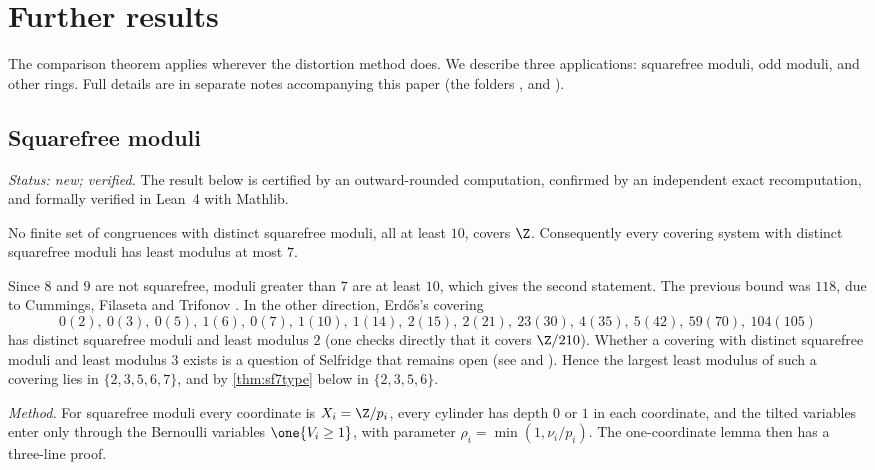 \section{Further results}\label{sec:further}
The comparison theorem applies wherever the distortion method does. We describe three applications: squarefree
moduli, odd moduli, and other rings. Full details are in separate notes accompanying this paper (the folders
,  and ).

\subsection{Squarefree moduli}\label{sec:squarefree}

\emph{Status: new; verified.} The result below is certified by an outward-rounded computation, confirmed by an
independent exact recomputation, and formally verified in Lean~4 with Mathlib.

\begin{theorem}\label{thm:squarefree}
No finite set of congruences with distinct squarefree moduli, all at least $10$, covers $\Z$. Consequently every
covering system with distinct squarefree moduli has least modulus at most $7$.
\end{theorem}

Since $8$ and $9$ are not squarefree, moduli greater than $7$ are at least $10$, which gives the second statement.
The previous bound was $118$, due to Cummings, Filaseta and Trifonov \cite{CFT2025}. In the other direction,
Erd\H{o}s's covering
\[
  0(2),\ 0(3),\ 0(5),\ 1(6),\ 0(7),\ 1(10),\ 1(14),\ 2(15),\ 2(21),\ 23(30),\ 4(35),\ 5(42),\ 59(70),\ 104(105)
\]
has distinct squarefree moduli and least modulus $2$ (one checks directly that it covers $\Z/210$). Whether a
covering with distinct squarefree moduli and least modulus $3$ exists is a question of Selfridge that remains open
(see \cite[F13]{GuyUPINT} and \cite[Problem~4]{DaltonTrifonov2022}). Hence the largest least modulus of such a
covering lies in $\{2,3,5,6,7\}$, and by \cref{thm:sf7type} below in $\{2,3,5,6\}$.

\emph{Method.} For squarefree moduli every coordinate is $X_i=\Z/p_i$, every cylinder has depth $0$ or $1$ in each
coordinate, and the tilted variables enter only through the Bernoulli variables $\one\{V_i\ge1\}$, with parameter
$\rho_i=\min(1,\nu_i/p_i)$. The one-coordinate lemma then has a three-line proof.

